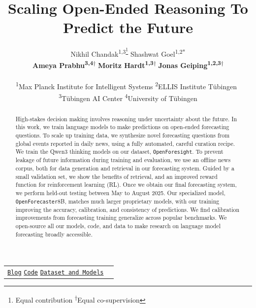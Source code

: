 \documentclass{article} %
\title{\vspace{-0.5cm}Scaling Open-Ended Reasoning To Predict the Future}
\author{
Nikhil Chandak\textsuperscript{1,3\thanks{Equal contribution \quad \textsuperscript{\ensuremath{\dagger}}Equal co-supervision}}\quad
Shashwat Goel\textsuperscript{1,2*}\\
\textbf{Ameya Prabhu\textsuperscript{3,4\ensuremath{\dagger}}}\quad
\textbf{Moritz Hardt\textsuperscript{1,3\ensuremath{\dagger}}}\quad
\textbf{Jonas Geiping\textsuperscript{1,2,3\ensuremath{\dagger}}}
\\\\
\textsuperscript{1}Max Planck Institute for Intelligent Systems \quad
\textsuperscript{2}ELLIS Institute T\"ubingen\ \\
\textsuperscript{3}T\"ubingen AI Center\quad
\textsuperscript{4}University of T\"ubingen
}
\newcommand{\ourdataset}{\texttt{OpenForesight}}
\newcommand{\ourmodel}{\texttt{OpenForecaster}}
\begin{document}
\maketitle


\vspace{-0.5cm}
\begin{center}
    \begin{tabular}{c@{\hskip 19pt}c}
    \hspace*{1.4cm}\raisebox{-1pt}{\faGlobe} \href{https://openforecaster.github.io/}{\texttt{Blog}}
    \hspace*{1.4cm}\raisebox{-1pt}{\faGithub} \href{https://github.com/OpenForecaster/scaling-forecasting-training}{\fontsize{8.8pt}{0pt}\texttt{Code}}
    \hspace*{1.6cm}\raisebox{-1.5pt}{\faDatabase}\href{https://huggingface.co/collections/nikhilchandak/openforecaster}{\fontsize{8.8pt}{0pt} \texttt{Dataset and Models}} 
\end{tabular}
\end{center}

\lhead{} %
\renewcommand{\headrulewidth}{0pt} %
\vspace{0.25cm}
\begin{abstract}
  
 High-stakes decision making involves reasoning under uncertainty about the future. In this work, we train language models to make predictions on open-ended forecasting questions. To scale up training data, we synthesize novel forecasting questions from global events reported in daily news, using a fully automated, careful curation recipe. We train the Qwen3 thinking models on our dataset, \ourdataset.  To prevent leakage of future information during training and evaluation, we use an offline news corpus, both for data generation and retrieval in our forecasting system. Guided by a small validation set, we show the benefits of retrieval, and an improved reward function for reinforcement learning (RL). Once we obtain our final forecasting system, we perform held-out testing between May to August 2025. Our specialized model, \ourmodel  8B, matches much larger proprietary models, with our training improving the accuracy, calibration, and consistency of predictions. We find calibration improvements from forecasting training generalize across popular benchmarks. We open-source all our models, code, and data to make research on language model forecasting broadly accessible. %
  
\end{abstract}
\vspace{-0.2cm}
\end{document}
